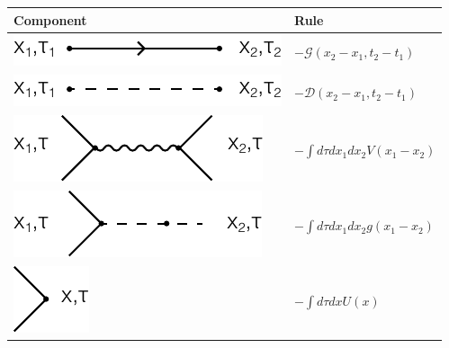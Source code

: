 \documentclass[12pt]{book}
\begin{document}
	\begin{table}[htp!]
		\centering
		\begin{tabular}{| >{\centering\arraybackslash}m{15em}|>{\centering\arraybackslash} m{12em}|}
		\hline
		\vspace{0.5ex}Component\vspace{0.5ex}&\vspace{0.5ex}Rule\vspace{0.5ex}\\
		\hline
		\vspace{2.5ex}\includegraphics[scale=1]{resources/chap_feyn_diag/fdiag_fruleT1.pdf}\vspace{1ex}&$-\mathcal G(x_2-x_1,t_2-t_1)$\vspace{0.5ex}\\
		\hline
		\vspace{2.5ex}\includegraphics[scale=1]{resources/chap_feyn_diag/fdiag_fruleT2.pdf}\vspace{1ex}&$-\mathcal D(x_2-x_1,t_2-t_1)$\vspace{0.5ex}\\
		\hline
		\vspace{2.5ex}\includegraphics[scale=1]{resources/chap_feyn_diag/fdiag_fruleT3.pdf}\vspace{1ex}&$-\int d\tau dx_1dx_2V(x_1-x_2)$\vspace{0.5ex}\\
		\hline
		\vspace{2.5ex}\includegraphics[scale=1]{resources/chap_feyn_diag/fdiag_fruleT4.pdf}\vspace{1ex}&$-\int d\tau dx_1dx_2g(x_1-x_2)$\vspace{0.5ex}\\
		\hline
		\vspace{2.5ex}\includegraphics[scale=1]{resources/chap_feyn_diag/fdiag_fruleT5.pdf}\vspace{1ex}&$-\int d\tau dxU(x)$\vspace{0.5ex}\\

\end{tabular}
\end{table}
\end{document}
